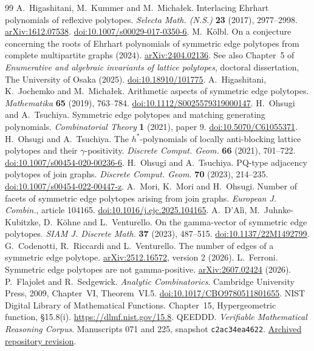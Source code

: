 \documentclass[11pt,a4paper]{article}
\theoremstyle{definition}\newtheorem{problem}[theorem]{Problem}
\newcommand{\arxiv}[1]{\href{https://arxiv.org/abs/#1}{arXiv:#1}}
\newcommand{\doi}[1]{\href{https://doi.org/#1}{doi:#1}}
\begin{document}
\begin{thebibliography}{99}\small
{} A.~Higashitani, M.~Kummer and M.~Micha\l{}ek.
Interlacing Ehrhart polynomials of reflexive polytopes.
\emph{Selecta Math. (N.S.)} \textbf{23} (2017), 2977--2998.
\arxiv{1612.07538}. \doi{10.1007/s00029-017-0350-6}.
 M.~K\"olbl. On a conjecture concerning the roots of Ehrhart polynomials of symmetric edge polytopes from complete multipartite graphs (2024). \arxiv{2404.02136}.
See also Chapter~5 of \emph{Enumerative and algebraic invariants of lattice polytopes}, doctoral dissertation, The University of Osaka (2025). \doi{10.18910/101775}.
 A.~Higashitani, K.~Jochemko and M.~Micha\l{}ek.
Arithmetic aspects of symmetric edge polytopes.
\emph{Mathematika} \textbf{65} (2019), 763--784.
\doi{10.1112/S0025579319000147}.
 H.~Ohsugi and A.~Tsuchiya. Symmetric edge polytopes and matching generating polynomials.
\emph{Combinatorial Theory} \textbf{1} (2021), paper 9. \doi{10.5070/C61055371}.
 H.~Ohsugi and A.~Tsuchiya. The $h^*$-polynomials of locally anti-blocking lattice polytopes and their $\gamma$-positivity. \emph{Discrete Comput. Geom.} \textbf{66} (2021), 701--722. \doi{10.1007/s00454-020-00236-6}.
 H.~Ohsugi and A.~Tsuchiya. PQ-type adjacency polytopes of join graphs. \emph{Discrete Comput. Geom.} \textbf{70} (2023), 214--235.
\doi{10.1007/s00454-022-00447-z}.
 A.~Mori, K.~Mori and H.~Ohsugi. Number of facets of symmetric edge polytopes arising from join graphs. \emph{European J. Combin.}, article 104165. \doi{10.1016/j.ejc.2025.104165}.
 A.~D'Al\`i, M.~Juhnke-Kubitzke, D.~K\"ohne and L.~Venturello.
On the gamma-vector of symmetric edge polytopes.
\emph{SIAM J. Discrete Math.} \textbf{37} (2023), 487--515. \doi{10.1137/22M1492799}.
 G.~Codenotti, R.~Riccardi and L.~Venturello. The number of edges of a symmetric edge polytope. \arxiv{2512.16572}, version 2 (2026).
 L.~Ferroni. Symmetric edge polytopes are not gamma-positive. \arxiv{2607.02424} (2026).
 P.~Flajolet and R.~Sedgewick. \emph{Analytic Combinatorics}. Cambridge University Press, 2009, Chapter~VI, Theorem~VI.5. \doi{10.1017/CBO9780511801655}.
 NIST Digital Library of Mathematical Functions. Chapter~15, Hypergeometric function, \S15.8(i). \url{https://dlmf.nist.gov/15.8}.
 QEEDDD. \emph{Verifiable Mathematical Reasoning Corpus}. Manuscripts 071 and 225, snapshot \texttt{c2ac34ea4622}. \href{https://github.com/QEEDDD/Verifiable-Mathematical-Reasoning-Corpus/tree/c2ac34ea4622778187173f41bb1996deee8081b7}{Archived repository revision}.
\end{thebibliography}
\end{document}
